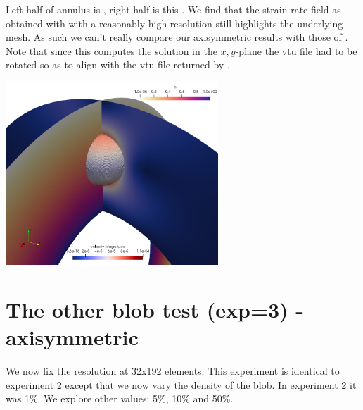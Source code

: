 \begin{center}
{\captionfont Left half of annulus is \aspect, right half is this \stone. 
We find that the strain rate field as obtained with \aspect with a reasonably high 
resolution still highlights the underlying mesh. As such we can't really compare our axisymmetric 
results with those of \aspect. Note that since this \stone computes the solution in the 
$x,y$-plane the vtu file had to be rotated so as to align with the vtu file returned by \aspect.}
\end{center}

\begin{center}
\includegraphics[width=8cm]{python_codes/fieldstone_152/results/exp2_axisymmetric/aspect/sols}
\end{center}

\newpage
\section*{The other blob test (exp=3) - axisymmetric}

We now fix the resolution at 32x192 elements. This experiment is identical to experiment 2
except that we now vary the density of the blob. In experiment 2 it was 1\%. We explore other values:
5\%, 10\% and 50\%.

